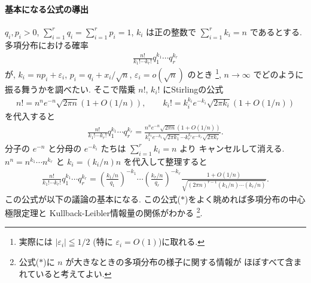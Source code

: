 \documentclass[12pt,twoside]{jarticle}
\newcommand\eps{\varepsilon}
\theoremstyle{jplain}
\theoremstyle{jplain}
\theoremstyle{jplain}
\numberwithin{theorem}{section}
\numberwithin{equation}{section}
\numberwithin{figure}{section}
\numberwithin{table}{section}
\begin{document}
\paragraph{基本になる公式の導出}
$q_i,p_i>0$, $\sum_{i=1}^r q_i=\sum_{i=1}^r p_i=1$, 
$k_i$ は正の整数で $\sum_{i=1}^r k_i=n$ であるとする.
多項分布における確率
\begin{align*}
\frac{n!}{k_1!\cdots k_r!}q_1^{k_1}\cdots q_r^{k_r}
\end{align*}
が, $k_i=np_i+\eps_i$, $p_i=q_i+x_i/\sqrt{n}$, $\eps_i=o(\sqrt{n})$ のとき%
\footnote{実際には $|\eps_i|\leqq 1/2$ (特に $\eps_i=O(1)$)に取れる.}, 
$n\to\infty$ でどのように振る舞うかを調べたい.
そこで階乗 $n!$, $k_i!$ にStirlingの公式
\begin{align*}
n! = n^n e^{-n}\sqrt{2\pi n}(1+O(1/n)), \qquad
k_i! = k_i^{k_i} e^{-k_i}\sqrt{2\pi k_i}(1+O(1/n))
\end{align*}
を代入すると
\begin{align*}
\frac{n!}{k_1!\cdots k_r!}q_1^{k_1}\cdots q_r^{k_r}
=
\frac
{n^n e^{-n}\sqrt{2\pi n}(1+O(1/n))}
{k_1^{k_1} e^{-k_1}\sqrt{2\pi k_1}\cdots k_r^{k_r} e^{-k_r}\sqrt{2\pi k_r}}.
\end{align*}
分子の $e^{-n}$ と分母の $e^{-k_i}$ たちは $\sum_{i=1}^r k_i=n$ より
キャンセルして消える. 
$n^n=n^{k_1}\cdots n^{k_r}$ と $k_i=(k_i/n)n$ を代入して整理すると
\begin{align*}
\frac{n!}{k_1!\cdots k_r!}q_1^{k_1}\cdots q_r^{k_r}
=
\left(\frac{k_1/n}{q_1}\right)^{-k_1}\cdots\left(\frac{k_r/n}{q_r}\right)^{-k_r}
\frac{1+O(1/n)}{\sqrt{(2\pi n)^{r-1}(k_1/n)\cdots(k_r/n)}}.
\tag{$*$}
\end{align*}
この公式が以下の議論の基本になる.
この公式($*$)をよく眺めれば多項分布の中心極限定理と
Kullback-Leibler情報量の関係がわかる%
\footnote{公式($*$)に $n$ が大きなときの多項分布の様子に関する情報が
ほぼすべて含まれていると考えてよい.}.
\end{document}
